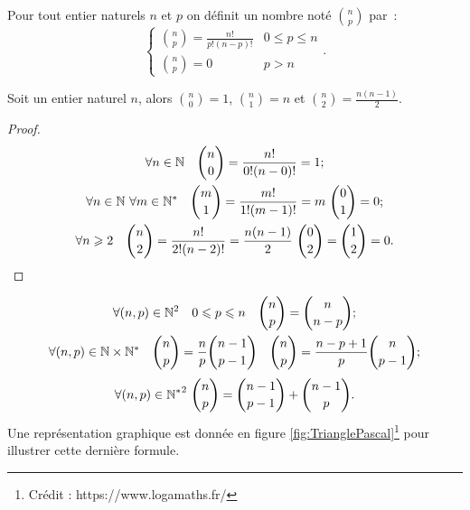 \begin{defdef}
  Pour tout entier naturels \(n\) et \(p\) on définit un nombre noté \(\binom{n}{p}\) par~:
  \begin{equation}
    \begin{cases}
      \binom{n}{p}=\frac{n!}{p!(n-p)!} & 0\leqslant p \leqslant n \\
      \binom{n}{p}=0 & p > n
    \end{cases}.
  \end{equation}
\end{defdef}
\begin{prop}
  Soit un entier naturel \(n\), alors \(\binom{n}{0}=1\), \(\binom{n}{1}=n\) et \(\binom{n}{2}=\frac{n(n-1)}{2}\).
\end{prop}
\begin{proof}
  \begin{gather}
    \forall n \in \N \quad \binom{n}{0}=\frac{n!}{0!(n-0)!}=1; \\
    \forall n \in \N \ \forall m\in \N^* \quad \binom{m}{1}=\frac{m!}{1!(m-1)!}=m \ \binom{0}{1}=0;\\
    \forall n \geqslant 2 \quad \binom{n}{2}=\frac{n!}{2!(n-2)!}=\frac{n(n-1)}{2} \ \binom{0}{2}=\binom{1}{2}=0.
  \end{gather}
\end{proof}
\begin{prop}
  \begin{gather}
    \forall (n,p)\in\mathbb{N}^2 \quad 0\leqslant p \leqslant n \quad \binom{n}{p}=\binom{n}{n-p};\\
    \forall (n,p)\in\mathbb{N}\times\mathbb{N}^* \quad \binom{n}{p}=\frac{n}{p}\binom{n-1}{p-1} \quad \binom{n}{p}=\frac{n-p+1}{p}\binom{n}{p-1};
  \end{gather}
  \begin{equation}
      \label{eq:TrianglePascal}
    \forall (n,p)\in{\N^*}^2 \ \binom{n}{p}=\binom{n-1}{p-1}+\binom{n-1}{p}.
  \end{equation}
  Une représentation graphique est donnée en figure
\ref{fig:TrianglePascal}\footnote{Crédit : https://www.logamaths.fr/} pour illustrer cette dernière formule.
\end{prop}
